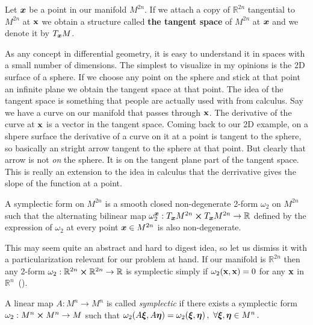 \documentclass[12pt, class=report, crop=false]{standalone}
\begin{document}
\begin{definition}
  Let \(\vb*{x}\) be a point in our manifold \(M^{2n}\). If we attach a copy of \(\mathbb{R}^{2n}\) tangential to \(M^{2n}\) at \(\vb{x}\) we obtain a structure called \textbf{the tangent space} of \(M^{2n}\) at \(\vb*{x}\) and we denote it by \(T_{\vb*{x}}M\).
\end{definition}

As any concept in differential geometry, it is easy to understand it in spaces with a small number of dimensions. The simplest to visualize in my opinions is the 2D surface of a sphere. If we choose any point on the sphere and stick at that point an infinite plane we obtain the tangent space at that point. The idea of the tangent space is something that people are actually used with from calculus. Say we have a curve on our manifold that passes through \(\vb{x}\). The derivative of the curve at \(\vb{x}\) is a vector in the tangent space. Coming back to our 2D example, on a shpere surface the derivative of a curve on it at a point is tangent to the sphere, so basically an stright arrow tangent to the sphere at that point. But clearly that arrow is not \textit{on} the sphere. It is on the tangent plane part of the tangent space. This is really an extension to the idea in calculus that the derrivative gives the slope of the function at a point.

\begin{definition}
  A symplectic form on \(M^{2n}\) is a smooth closed non-degenerate 2-form \(\omega_2\) on \(M^{2n}\) such that the alternating bilinear map \(\omega_2^{\vb*{x}} : T_{\vb*{x}}M^{2n} \cp T_{\vb*{x}}M^{2n} \rightarrow \mathbb{R}\) defined by the expression of \(\omega_2\) at every point \(\vb*{x} \in M^{2n}\) is also non-degenerate.
\end{definition}

This may seem quite an abstract and hard to digest idea, so let us dismiss it with a particularization relevant for our problem at hand. If our manifold is \(\mathbb{R}^{2n}\) then any 2-form \(\omega_2 : \mathbb{R}^{2n} \cp \mathbb{R}^{2n} \rightarrow \mathbb{R}\) is symplectic simply if \(\omega_2 (\vb{x},\vb{x}) = 0\) for any \(\vb{x}\) in \(\mathbb{R}^{n}\)~(\cite{weissteinSymplecticForm}).

\begin{definition}
  A linear map \(A: M^{n} \to M^{n}\) is called
  \emph{symplectic} if there exists a symplectic form \(\omega_2: M^n \cp M^n \rightarrow M\)
  such that
  \(
  \omega_2 (A\vb*{\xi}, A\vb*{\eta}) = \omega_2 (\vb*{\xi},\vb*{\eta})\,,\
  \forall \vb*{\xi}, \vb*{\eta} \in M^{n}\,.
  \)
\end{definition}
\end{document}
